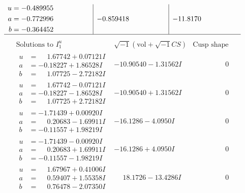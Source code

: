 \documentclass[1p]{elsarticle_modified}
\theoremstyle{definition}
\newcommand{\I}{\sqrt{-1}}
\begin{document}
$$\begin{array}{c|c|c}
\begin{aligned}
u &= -0.489955\phantom{ +0.000000I} \\
a &= -0.772996\phantom{ +0.000000I} \\
b &= -0.364452\phantom{ +0.000000I}\end{aligned}
 & -0.859418\phantom{ +0.000000I} & -11.8170\phantom{ +0.000000I}\\
 \hline 
 \end{array}$$\newpage$$\begin{array}{c|c|c}  
\text{Solutions to }I^u_{1}& \I (\text{vol} + \sqrt{-1}CS) & \text{Cusp shape}\\
 \hline 
\begin{aligned}
u &= \phantom{-}1.67742 + 0.07121 I \\
a &= -0.18227 + 1.86528 I \\
b &= \phantom{-}1.07725 - 2.72182 I\end{aligned}
 & -10.90540 - 1.31562 I & \phantom{-0.000000 } 0 \\ \hline\begin{aligned}
u &= \phantom{-}1.67742 - 0.07121 I \\
a &= -0.18227 - 1.86528 I \\
b &= \phantom{-}1.07725 + 2.72182 I\end{aligned}
 & -10.90540 + 1.31562 I & \phantom{-0.000000 } 0 \\ \hline\begin{aligned}
u &= -1.71439 + 0.00920 I \\
a &= \phantom{-}0.20683 - 1.69911 I \\
b &= -0.11557 + 1.98219 I\end{aligned}
 & -16.1286 - 4.0950 I & \phantom{-0.000000 } 0 \\ \hline\begin{aligned}
u &= -1.71439 - 0.00920 I \\
a &= \phantom{-}0.20683 + 1.69911 I \\
b &= -0.11557 - 1.98219 I\end{aligned}
 & -16.1286 + 4.0950 I & \phantom{-0.000000 } 0 \\ \hline\begin{aligned}
u &= \phantom{-}1.67967 + 0.41006 I \\
a &= \phantom{-}0.59407 + 1.55358 I \\
b &= \phantom{-}0.76478 - 2.07350 I\end{aligned}
 & \phantom{-}18.1726 - 13.4286 I & \phantom{-0.000000 } 0 \\ \hline\begin{aligned}

\end{aligned}
\end{array}$$
\end{document}
